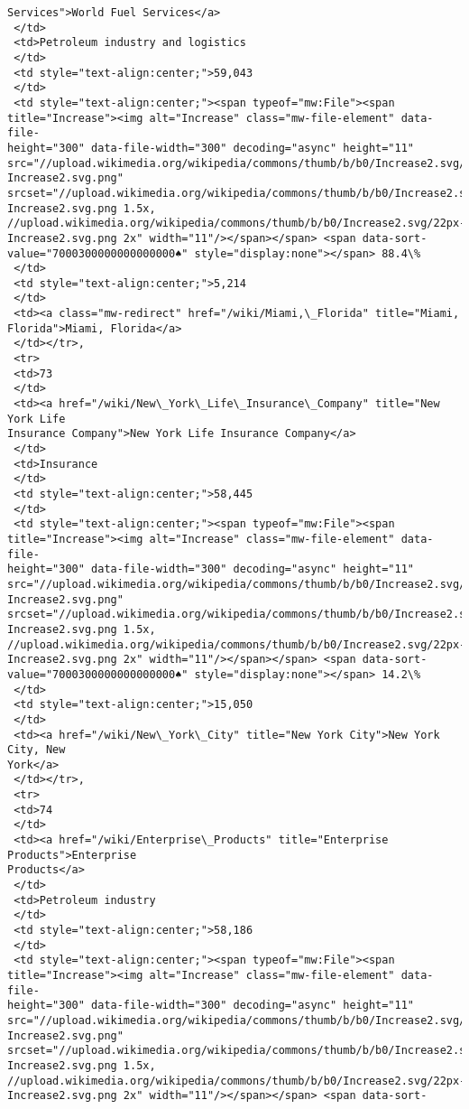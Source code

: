\documentclass[11pt]{article}
\begin{document}
\begin{tcolorbox}[breakable, size=fbox, boxrule=.5pt, pad at break*=1mm, opacityfill=0]
\begin{Verbatim}[commandchars=\\\{\}]
Services">World Fuel Services</a>
 </td>
 <td>Petroleum industry and logistics
 </td>
 <td style="text-align:center;">59,043
 </td>
 <td style="text-align:center;"><span typeof="mw:File"><span
title="Increase"><img alt="Increase" class="mw-file-element" data-file-
height="300" data-file-width="300" decoding="async" height="11"
src="//upload.wikimedia.org/wikipedia/commons/thumb/b/b0/Increase2.svg/11px-
Increase2.svg.png"
srcset="//upload.wikimedia.org/wikipedia/commons/thumb/b/b0/Increase2.svg/17px-
Increase2.svg.png 1.5x,
//upload.wikimedia.org/wikipedia/commons/thumb/b/b0/Increase2.svg/22px-
Increase2.svg.png 2x" width="11"/></span></span> <span data-sort-
value="7000300000000000000♠" style="display:none"></span> 88.4\%
 </td>
 <td style="text-align:center;">5,214
 </td>
 <td><a class="mw-redirect" href="/wiki/Miami,\_Florida" title="Miami,
Florida">Miami, Florida</a>
 </td></tr>,
 <tr>
 <td>73
 </td>
 <td><a href="/wiki/New\_York\_Life\_Insurance\_Company" title="New York Life
Insurance Company">New York Life Insurance Company</a>
 </td>
 <td>Insurance
 </td>
 <td style="text-align:center;">58,445
 </td>
 <td style="text-align:center;"><span typeof="mw:File"><span
title="Increase"><img alt="Increase" class="mw-file-element" data-file-
height="300" data-file-width="300" decoding="async" height="11"
src="//upload.wikimedia.org/wikipedia/commons/thumb/b/b0/Increase2.svg/11px-
Increase2.svg.png"
srcset="//upload.wikimedia.org/wikipedia/commons/thumb/b/b0/Increase2.svg/17px-
Increase2.svg.png 1.5x,
//upload.wikimedia.org/wikipedia/commons/thumb/b/b0/Increase2.svg/22px-
Increase2.svg.png 2x" width="11"/></span></span> <span data-sort-
value="7000300000000000000♠" style="display:none"></span> 14.2\%
 </td>
 <td style="text-align:center;">15,050
 </td>
 <td><a href="/wiki/New\_York\_City" title="New York City">New York City, New
York</a>
 </td></tr>,
 <tr>
 <td>74
 </td>
 <td><a href="/wiki/Enterprise\_Products" title="Enterprise Products">Enterprise
Products</a>
 </td>
 <td>Petroleum industry
 </td>
 <td style="text-align:center;">58,186
 </td>
 <td style="text-align:center;"><span typeof="mw:File"><span
title="Increase"><img alt="Increase" class="mw-file-element" data-file-
height="300" data-file-width="300" decoding="async" height="11"
src="//upload.wikimedia.org/wikipedia/commons/thumb/b/b0/Increase2.svg/11px-
Increase2.svg.png"
srcset="//upload.wikimedia.org/wikipedia/commons/thumb/b/b0/Increase2.svg/17px-
Increase2.svg.png 1.5x,
//upload.wikimedia.org/wikipedia/commons/thumb/b/b0/Increase2.svg/22px-
Increase2.svg.png 2x" width="11"/></span></span> <span data-sort-

\end{Verbatim}
\end{tcolorbox}
\end{document}
